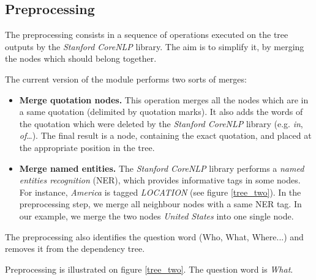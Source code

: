
\subsection{Preprocessing}

The preprocessing consists in a sequence of operations executed on the tree outputs by the \emph{Stanford CoreNLP} library. The aim is to simplify it, by merging the nodes which should belong together.

The current version of the module performs two sorts of merges:
\begin{itemize}
    \item \textbf{Merge quotation nodes.} This operation merges all the nodes which are in a same quotation (delimited by quotation marks). It also adds the words
    of the quotation which were deleted by the \emph{Stanford CoreNLP} library (e.g. \emph{in}, \emph{of}\dots). The final result is a node, containing the
    exact quotation, and placed at the appropriate position in the tree.
    
    \item \textbf{Merge named entities.} The \emph{Stanford CoreNLP} library performs a \emph{named entities recognition} (NER), which provides informative 
    tags in some nodes. For instance, \emph{America} is tagged \emph{LOCATION} (see figure \ref{tree_two}). In the preprocessing step, we merge all neighbour nodes with a same NER tag. In our example, we merge the two nodes \emph{United States} into one single node.
\end{itemize}

The preprocessing also identifies the question word (Who, What, Where...) and removes it from the dependency tree.

Preprocessing is illustrated on figure \ref{tree_two}. The question word is \textit{What}.


